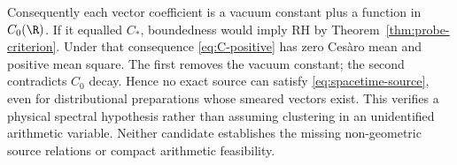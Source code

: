 Consequently each vector coefficient is a vacuum constant
plus a function in $C_0(\R)$. If it equalled $C_*$, boundedness
would imply RH by Theorem~\ref{thm:probe-criterion}.
Under that consequence \eqref{eq:C-positive} has zero Ces\`aro
mean and positive mean square. The first removes the vacuum
constant; the second contradicts $C_0$ decay. Hence no exact
source can satisfy \eqref{eq:spacetime-source}, even for
distributional preparations whose smeared vectors exist.
This verifies a physical spectral hypothesis rather than
assuming clustering in an unidentified arithmetic variable.
Neither candidate establishes the missing non-geometric
source relations or compact arithmetic feasibility.
